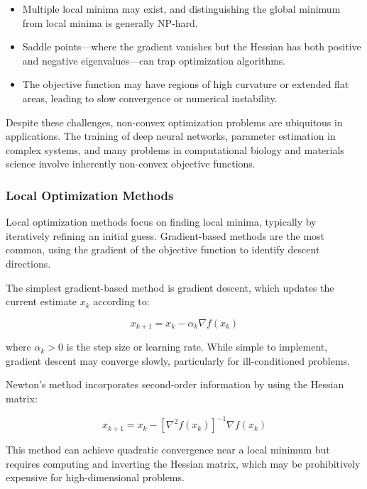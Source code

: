 \begin{itemize}
\item Multiple local minima may exist, and distinguishing the global minimum from local minima is generally NP-hard.
\item Saddle points—where the gradient vanishes but the Hessian has both positive and negative eigenvalues—can trap optimization algorithms.
\item The objective function may have regions of high curvature or extended flat areas, leading to slow convergence or numerical instability.
\end{itemize}

Despite these challenges, non-convex optimization problems are ubiquitous in applications. The training of deep neural networks, parameter estimation in complex systems, and many problems in computational biology and materials science involve inherently non-convex objective functions.

\subsubsection{Local Optimization Methods}

Local optimization methods focus on finding local minima, typically by iteratively refining an initial guess. Gradient-based methods are the most common, using the gradient of the objective function to identify descent directions.

The simplest gradient-based method is gradient descent, which updates the current estimate $x_k$ according to:

\begin{equation}
x_{k+1} = x_k - \alpha_k \nabla f(x_k)
\end{equation}

where $\alpha_k > 0$ is the step size or learning rate. While simple to implement, gradient descent may converge slowly, particularly for ill-conditioned problems.

Newton's method incorporates second-order information by using the Hessian matrix:

\begin{equation}
x_{k+1} = x_k - [\nabla^2 f(x_k)]^{-1} \nabla f(x_k)
\end{equation}

This method can achieve quadratic convergence near a local minimum but requires computing and inverting the Hessian matrix, which may be prohibitively expensive for high-dimensional problems.


